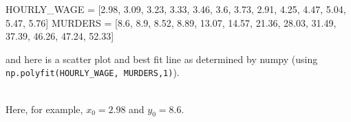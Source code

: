 \documentclass[titlepage]{tufte-book}
\begin{document}
\begin{fullwidth}
\begin{pyverbatim}
HOURLY_WAGE = [2.98, 3.09, 3.23, 3.33, 3.46, 3.6, 3.73, 2.91, 4.25, 4.47, 5.04, 5.47, 5.76]
MURDERS = [8.6, 8.9, 8.52, 8.89, 13.07, 14.57, 21.36, 28.03, 31.49, 37.39, 46.26, 47.24, 52.33]
\end{pyverbatim}

\noindent and here is a scatter plot and best fit line as determined by numpy (using {\tt\footnotesize np.polyfit(HOURLY\_WAGE, MURDERS,1)}).

\\

\noindent Here, for example, $x_0 = 2.98$ and $y_0 = 8.6$.


\end{fullwidth}
\end{document}
